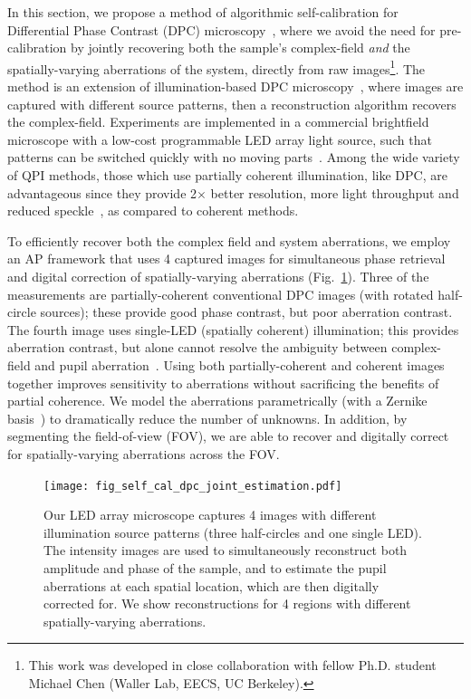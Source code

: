 In this section, we propose a method of algorithmic self-calibration for Differential Phase Contrast (DPC) microscopy~\cite{kachar1985asymmetric,mehta2009quantitative,tian2015quantitative,Claus2015,chen20163d,PhillipsChen17cDPC}, where we avoid the need for pre-calibration by jointly recovering both the sample's complex-field \textit{and} the spatially-varying aberrations of the system, directly from raw images\footnote{This work was developed in close collaboration with fellow Ph.D. student Michael Chen (Waller Lab, EECS, UC Berkeley).}. The method is an extension of illumination-based DPC microscopy~\cite{mehta2009quantitative,tian2015quantitative}, where images are captured with different source patterns, then a reconstruction algorithm recovers the complex-field. Experiments are implemented in a commercial brightfield microscope with a low-cost programmable LED array light source, such that patterns can be switched quickly with no moving parts~\cite{Zheng2013,Liu2014,tian2015quantitative,tian2015computational}. Among the wide variety of QPI methods, those which use partially coherent illumination, like DPC, are advantageous since they provide 2$\times$ better resolution, more light throughput and reduced speckle~\cite{Wang:11,rodrigo2014rapid,jingshan2015partially,tian2015quantitative}, as compared to coherent methods. 

 
To efficiently recover both the complex field and system aberrations, we employ an AP framework that uses 4 captured images for simultaneous phase retrieval and digital correction of spatially-varying aberrations (Fig.~\ref{fig:self_cal_dpc_joint_estimation}). Three of the measurements are partially-coherent conventional DPC images (with rotated half-circle sources); these provide good phase contrast, but poor aberration contrast. The fourth image uses single-LED (spatially coherent) illumination; this provides aberration contrast, but alone cannot resolve the ambiguity between complex-field and pupil aberration~\cite{lu2016quantitative}. Using both partially-coherent and coherent images together improves sensitivity to aberrations without sacrificing the benefits of partial coherence. We model the aberrations parametrically (with a Zernike basis~\cite{ZERNIKE1934689, zheng2013characterization}) to dramatically reduce the number of unknowns. In addition, by segmenting the field-of-view (FOV), we are able to recover and digitally correct for spatially-varying aberrations across the FOV.

\begin{figure}[ht!]
\centering\texttt{[image: fig\_self\_cal\_dpc\_joint\_estimation.pdf]}
\caption{\label{fig:self_cal_dpc_joint_estimation} Our LED array microscope captures 4 images with different illumination source patterns (three half-circles and one single LED). The intensity images are used to simultaneously reconstruct both amplitude and phase of the sample, and to estimate the pupil aberrations at each spatial location, which are then digitally corrected for. We show reconstructions for 4 regions with different spatially-varying aberrations.}
\end{figure}

